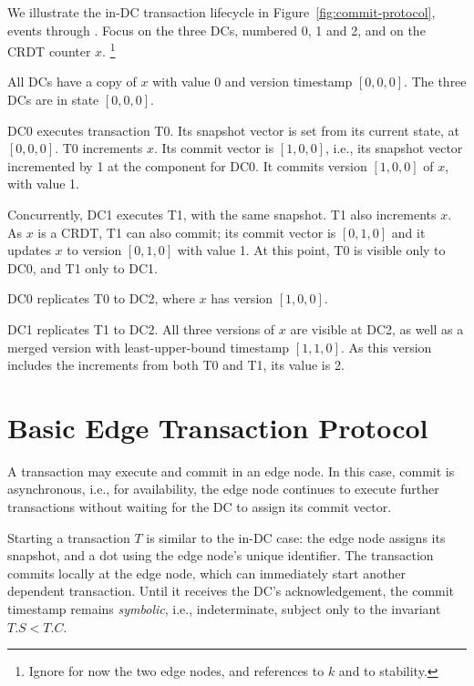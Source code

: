 We illustrate the in-DC transaction lifecycle in
Figure~\ref{fig:commit-protocol}, events  through
.
Focus on the three DCs, numbered 0, 1 and 2, and on the CRDT counter $x$.%
%
\footnote{
  Ignore for now the two edge nodes, and references to $k$ and
  to stability.
}
%
\begin{inparaenum}
\item[\refevent{txn:init}]
  All DCs have a copy of $x$ with value $0$ and version timestamp
  $[0,0,0]$.
  The three DCs are in state $[0,0,0]$.
\item[\refevent{txn:T0}]
  DC0 executes transaction T0.  Its snapshot vector is set from its
  current state, at $[0,0,0]$.
  T0 increments $x$.
  Its commit vector is $[1,0,0]$, i.e., its snapshot vector incremented
  by 1 at the component for DC0.
  It commits version $[1,0,0]$ of $x$, with value 1.
\item[\refevent{txn:T1}]
  Concurrently, DC1 executes T1, with the same snapshot.
  T1 also increments $x$.
  As $x$ is a CRDT, T1 can also commit; its commit vector is $[0,1,0]$
  and it updates $x$ to version $[0,1,0]$ with value 1.
  At this point, T0 is visible only to DC0, and T1 only to DC1.
\item[\refevent{txn:T0:DC2}]
  DC0 replicates T0 to DC2, where $x$ has version $[1,0,0]$.
\item[\refevent{txn:T1:DC2}]
  DC1 replicates T1 to DC2.
  All three versions of $x$ are visible at DC2, as well as a merged
  version with least-upper-bound timestamp $[1,1,0]$.
  As this version includes the increments from both T0 and T1, its value
  is 2.
\end{inparaenum}

\section{Basic Edge Transaction Protocol}
\label{sec:edge-trans-prot}

A transaction may execute and commit in an edge node.
In this case, commit is asynchronous, i.e., for
availability, the
edge node continues to execute further transactions without waiting for
the DC to assign its commit vector.

Starting a transaction $T$ is similar to the in-DC case: the edge node
assigns its snapshot, and a dot using the edge node's unique identifier.
The transaction commits locally at the edge node, which can immediately
start another dependent transaction.
Until it receives the DC's acknowledgement, the commit timestamp remains
\emph{symbolic}, i.e., indeterminate, subject only to the invariant $T.S
< T.C$.

